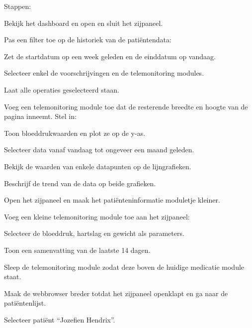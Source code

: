     \noindent Stappen:
    \vspace{-6pt}
    \begin{myenumerate}
        \item Bekijk het dashboard en open en sluit het zijpaneel.
        \item Pas een filter toe op de historiek van de pati\"{e}ntendata:
        \begin{myenumerate}
            \item Zet de startdatum op een week geleden en de einddatum op vandaag.
            \item Selecteer enkel de voorschrijvingen en de telemonitoring modules.
            \item Laat alle operaties geselecteerd staan.
        \end{myenumerate}
        \item Voeg een telemonitoring module toe dat de resterende breedte en hoogte van de pagina inneemt. Stel in:
        \begin{myenumerate}
            \item Toon bloeddrukwaarden en plot ze op de y-as.
            \item Selecteer data vanaf vandaag tot ongeveer een maand geleden.
            \item Bekijk de waarden van enkele datapunten op de lijngrafieken.
            \item Beschrijf de trend van de data op beide grafieken.
        \end{myenumerate}
        \item Open het zijpaneel en maak het pati\"{e}nteninformatie moduletje kleiner.
        \item Voeg een kleine telemonitoring module toe aan het zijpaneel:
        \begin{myenumerate}
            \item Selecteer de bloeddruk, hartslag en gewicht als parameters.
            \item Toon een samenvatting van de laatste 14 dagen.
        \end{myenumerate}
        \item Sleep de telemonitoring module zodat deze boven de huidige medicatie module staat.
        \vspace{10pt}
        \item Maak de webbrowser breder totdat het zijpaneel openklapt en ga naar de pati\"{e}ntenlijst.
        \item Selecteer pati\"{e}nt ``Jozefien Hendrix''.
    \end{myenumerate}

